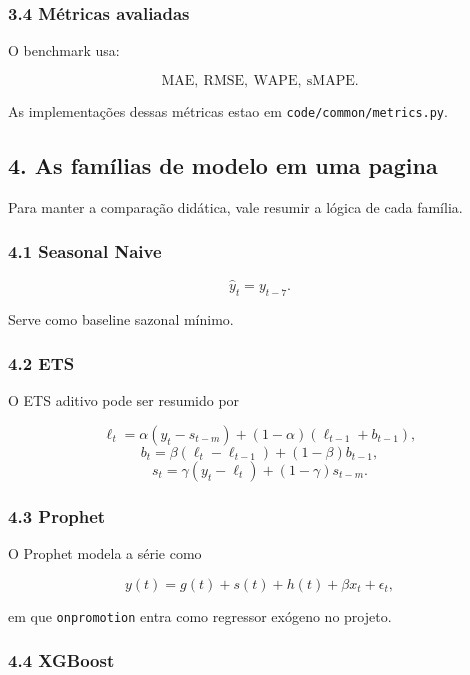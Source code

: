 \documentclass[12pt]{article}
\begin{document}
\subsubsection{3.4 Métricas avaliadas}\label{34-muxe9tricas-avaliadas}

O benchmark usa:

\[
\mathrm{MAE},\ \mathrm{RMSE},\ \mathrm{WAPE},\ \mathrm{sMAPE}.
\]

As implementações dessas métricas estao em \texttt{code/common/metrics.py}.

\subsection{4. As famílias de modelo em uma pagina}\label{4-as-famuxedlias-de-modelo-em-uma-pagina}

Para manter a comparação didática, vale resumir a lógica de cada família.

\subsubsection{4.1 Seasonal Naive}\label{41-seasonal-naive}

\[
\hat{y}_t = y_{t-7}.
\]

Serve como baseline sazonal mínimo.

\subsubsection{4.2 ETS}\label{42-ets}

O ETS aditivo pode ser resumido por

\[
\ell_t = \alpha (y_t - s_{t-m}) + (1 - \alpha)(\ell_{t-1} + b_{t-1}),
\]
\[
b_t = \beta (\ell_t - \ell_{t-1}) + (1 - \beta) b_{t-1},
\]
\[
s_t = \gamma (y_t - \ell_t) + (1 - \gamma) s_{t-m}.
\]

\subsubsection{4.3 Prophet}\label{43-prophet}

O Prophet modela a série como

\[
y(t) = g(t) + s(t) + h(t) + \beta x_t + \epsilon_t,
\]

em que \texttt{onpromotion} entra como regressor exógeno no projeto.

\subsubsection{4.4 XGBoost}\label{44-xgboost}
\end{document}
